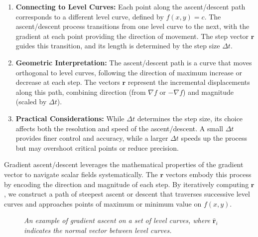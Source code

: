 \begin{enumerate}
    \item \textbf{Connecting to Level Curves:} 
    Each point along the ascent/descent path corresponds to a different level curve, defined by \( f(x, y) = c \). The ascent/descent process transitions from one level curve to the next, with the gradient at each point providing the direction of movement. The step vector \( \mathbf{r} \) guides this transition, and its length is determined by the step size \( \Delta t \).

    \item \textbf{Geometric Interpretation:}
    The ascent/descent path is a curve that moves orthogonal to level curves, following the direction of maximum increase or decrease at each step. The vectors \( \mathbf{r} \) represent the incremental displacements along this path, combining direction (from \( \nabla f \) or \( -\nabla f \)) and magnitude (scaled by \( \Delta t \)).

    \item \textbf{Practical Considerations:}
    While \( \Delta t \) determines the step size, its choice affects both the resolution and speed of the ascent/descent. A small \( \Delta t \) provides finer control and accuracy, while a larger \( \Delta t \) speeds up the process but may overshoot critical points or reduce precision.
\end{enumerate}

\noindent Gradient ascent/descent leverages the mathematical properties of the gradient vector to navigate scalar fields systematically. The \( \mathbf{r} \) vectors embody this process by encoding the direction and magnitude of each step. By iteratively computing \( \mathbf{r} \), we construct a path of steepest ascent or descent that traverses successive level curves and approaches points of maximum or minimum value on \( f(x, y) \).


\begin{figure}[H]
\centering
\caption{\textit{An example of gradient ascent on a set of level curves, where $\mathbf{\hat{r}}_i$ indicates the normal vector between level curves.}}
\end{figure}

